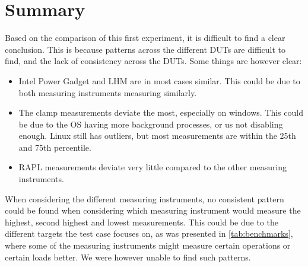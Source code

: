 \section{Summary}

Based on the comparison of this first experiment, it is difficult to find a clear conclusion. This is because patterns across the different DUTs are difficult to find, and the lack of consistency across the DUTs. Some things are however clear:

\begin{itemize}
    \item Intel Power Gadget and LHM are in most cases similar. This could be due to both measuring instruments measuring similarly.
    \item The clamp measurements deviate the most, especially on windows. This could be due to the OS having more background processes, or us not disabling enough. Linux still has outliers, but most measurements are within the 25th and 75th percentile.
    \item RAPL measurements deviate very little compared to the other measuring instruments.
\end{itemize}

When considering the different measuring instruments, no consistent pattern could be found when considering which measuring instrument would measure the highest, second highest and lowest measurements. This could be due to the different targets the test case focuses on, as was presented in \cref{tab:benchmarks}, where some of the measuring instruments might measure certain operations or certain loads better. We were however unable to find such patterns.


